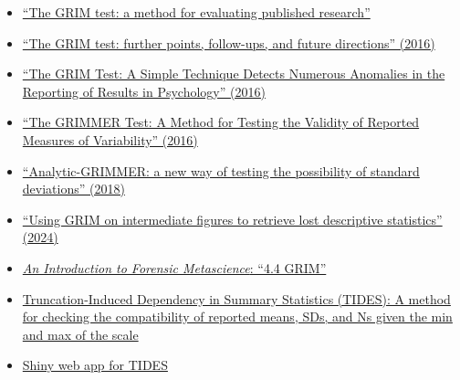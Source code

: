 \documentclass[letterpaper, 12pt]{article}
\begin{document}
\begin{itemize}
    \setlength\itemsep{-0.5em}
    \item \href{https://jamesheathers.medium.com/the-grim-test-a-method-for-evaluating-published-research-9a4e5f05e870}{``The GRIM test: a method for evaluating published research''}

    \item \href{https://jamesheathers.medium.com/the-grim-test-further-points-follow-ups-and-future-directions-afd55ff67bb0\#.vmgjvdvkf}{``The GRIM test: further points, follow-ups, and future directions'' (2016)}

    \item \href{https://doi.org/10.1177/1948550616673876}{``The GRIM Test: A Simple Technique Detects Numerous Anomalies in the Reporting of Results in Psychology'' (2016)}

    \item \href{https://doi.org/10.7287/peerj.preprints.2400v1}{``The GRIMMER Test: A Method for Testing the Validity of Reported Measures of Variability'' (2016)}

    \item \href{https://aurelienallard.netlify.app/post/anaytic-grimmer-possibility-standard-deviations/}{``Analytic-GRIMMER: a new way of testing the possibility of standard deviations'' (2018)}

    \item \href{https://doi.org/10.17605/OSF.IO/M82S6}{``Using GRIM on intermediate figures to retrieve lost descriptive statistics'' (2024)}

    \item \href{https://doi.org/10.5281/zenodo.14871842}{\textit{An Introduction to Forensic Metascience}: ``4.4 GRIM''}

    \item \href{https://github.com/ianhussey/tides}{Truncation-Induced Dependency in Summary Statistics (TIDES): A method for checking the compatibility of reported means, SDs, and Ns given the min and max of the scale}

    \item \href{https://errors.shinyapps.io/TIDES/}{Shiny web app for TIDES}
\end{itemize}
\end{document}
